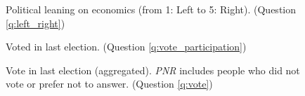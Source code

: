 \documentclass[12pt,english]{article}
\begin{document}
\begin{figure}[h!] 
    \caption[Political leaning]{Political leaning on economics (from 1: Left to 5: Right). (Question \ref{q:left_right})}\label{fig:left_right}
\end{figure}

\begin{figure}[h!] 
    \caption[Voted in last election]{Voted in last election. (Question \ref{q:vote_participation})}\label{fig:vote_participation}
\end{figure}

\begin{figure}[h!] 
    \caption[Vote in last election]{Vote in last election (aggregated). \textit{PNR} includes people who did not vote or prefer not to answer. (Question \ref{q:vote})}\label{fig:vote}
\end{figure}
\end{document}
